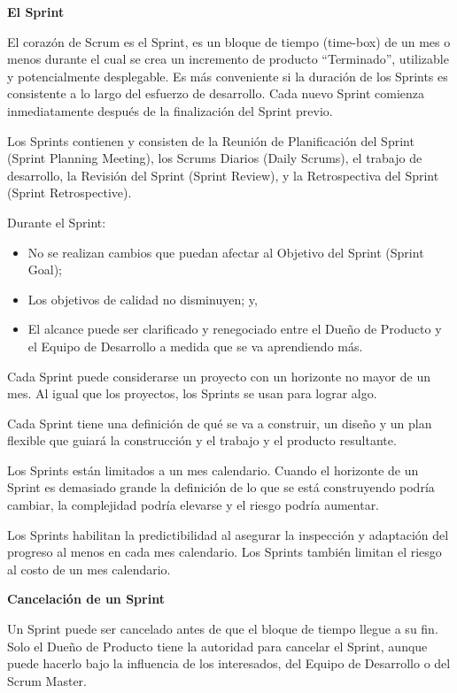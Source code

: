 \documentclass[12pt]{report}%
\begin{document}
\textbf {El Sprint }

El corazón de Scrum es el Sprint, es un bloque de tiempo (time-box) de un mes o menos durante el cual se crea un incremento de producto “Terminado”, utilizable y potencialmente desplegable.
Es más conveniente si la duración de los Sprints es consistente a lo largo del esfuerzo de desarrollo. Cada nuevo Sprint comienza inmediatamente después de la finalización del Sprint previo. 

Los Sprints contienen y consisten de la Reunión de Planificación del Sprint (Sprint Planning Meeting), los Scrums Diarios (Daily Scrums), el trabajo de desarrollo, la Revisión del Sprint (Sprint Review), y la Retrospectiva del Sprint (Sprint Retrospective).

Durante el Sprint: 
\begin{itemize}
\item No se realizan cambios que puedan afectar al Objetivo del Sprint (Sprint Goal); 
\item Los objetivos de calidad no disminuyen; y, 
\item El alcance puede ser clarificado y renegociado entre el Dueño de Producto y el Equipo de Desarrollo a medida que se va aprendiendo más. 
\end{itemize}

Cada Sprint puede considerarse un proyecto con un horizonte no mayor de un mes. Al igual que los proyectos, los Sprints se usan para lograr algo. 

Cada Sprint tiene una definición de qué se va a construir, un diseño y un plan flexible que guiará la construcción y el trabajo y el producto resultante.

Los Sprints están limitados a un mes calendario. Cuando el horizonte de un Sprint es demasiado grande la definición de lo que se está construyendo podría cambiar, la complejidad podría elevarse y el riesgo podría aumentar. 

Los Sprints habilitan la predictibilidad al asegurar la inspección y adaptación del progreso al menos en cada mes calendario. Los Sprints también limitan el riesgo al costo de un mes calendario.

\textbf { Cancelación de un Sprint } 

Un Sprint puede ser cancelado antes de que el bloque de tiempo llegue a su fin. Solo el Dueño de Producto tiene la autoridad para cancelar el Sprint, aunque puede hacerlo bajo la influencia de los interesados, del Equipo de Desarrollo o del Scrum Master. 
\end{document}
